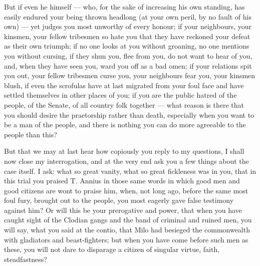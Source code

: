  But if even he himself --- who, for the sake of increasing his own standing, has easily endured your being thrown headlong (at your own peril, by no fault of his own) --- yet judges you most unworthy of every honour; if your neighbours, your kinsmen, your fellow tribesmen so hate you that they have reckoned your defeat as their own triumph; if no one looks at you without groaning, no one mentions you without cursing, if they shun you, flee from you, do not want to hear of you, and, when they have seen you, ward you off as a bad omen; if your relations spit you out, your fellow tribesmen curse you, your neighbours fear you, your kinsmen blush, if even the scrofulas have at last migrated from your foul face and have settled themselves in other places of you; if you are the public hatred of the people, of the Senate, of all country folk together --- what reason is there that you should desire the praetorship rather than death, especially when you want to be a man of the people, and there is nothing you can do more agreeable to the people than this?

 But that we may at last hear how copiously you reply to my questions, I shall now close my interrogation, and at the very end ask you a few things about the case itself. I ask: what so great vanity, what so great fickleness was in you, that in this trial you praised T. Annius in those same words in which good men and good citizens are wont to praise him, when, not long ago, before the same most foul fury, brought out to the people, you most eagerly gave false testimony against him? Or will this be your prerogative and power, that when you have caught sight of the Clodian gangs and the band of criminal and ruined men, you will say, what you said at the contio, that Milo had besieged the commonwealth with gladiators and beast-fighters; but when you have come before such men as these, you will not dare to disparage a citizen of singular virtue, faith, steadfastness?

